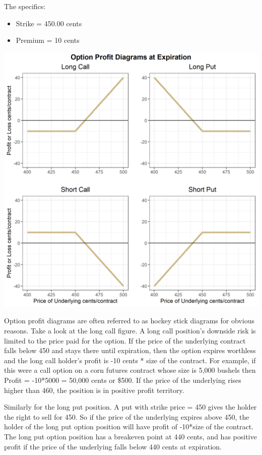 \documentclass[
]{book}
\begin{document}
The specifics:

\begin{itemize}
\item
  Strike = 450.00 cents
\item
  Premium = 10 cents
\end{itemize}

\includegraphics{assets/Options1-optionplot.png}

Option profit diagrams are often referred to as hockey stick diagrams for obvious reasons. Take a look at the long call figure. A long call position's downside risk is limited to the price paid for the option. If the price of the underlying contract falls below 450 and stays there until expiration, then the option expires worthless and the long call holder's profit is -10 cents * size of the contract. For example, if this were a call option on a corn futures contract whose size is 5,000 bushels then Profit = -10*5000 = 50,000 cents or \$500. If the price of the underlying rises higher than 460, the position is in positive profit territory.

Similarly for the long put position. A put with strike price = 450 gives the holder the right to sell for 450. So if the price of the underlying expires above 450, the holder of the long put option position will have profit of -10*size of the contract. The long put option position has a breakeven point at 440 cents, and has positive profit if the price of the underlying falls below 440 cents at expiration.
\end{document}

